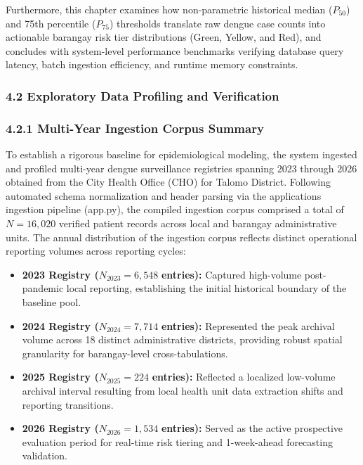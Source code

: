 \documentclass[
]{article}
\begin{document}
Furthermore, this chapter examines how non-parametric historical median
(\(P_{50}\)) and 75th percentile (\(P_{75}\)) thresholds translate raw
dengue case counts into actionable barangay risk tier distributions
(Green, Yellow, and Red), and concludes with system-level performance
benchmarks verifying database query latency, batch ingestion efficiency,
and runtime memory constraints.

\subsubsection{\texorpdfstring{\textbf{4.2 Exploratory Data Profiling
and Verification}
}{4.2 Exploratory Data Profiling and Verification }}\label{exploratory-data-profiling-and-verification}

\subsubsection{}\label{section-10}

\subsubsection{\texorpdfstring{\textbf{4.2.1 Multi-Year Ingestion Corpus
Summary}}{4.2.1 Multi-Year Ingestion Corpus Summary}}\label{multi-year-ingestion-corpus-summary}

To establish a rigorous baseline for epidemiological modeling, the
system ingested and profiled multi-year dengue surveillance registries
spanning 2023 through 2026 obtained from the City Health Office (CHO)
for Talomo District. Following automated schema normalization and header
parsing via the application\textquotesingle s ingestion pipeline
(app.py), the compiled ingestion corpus comprised a total of
\(N = 16,020\) verified patient records across local and barangay
administrative units. The annual distribution of the ingestion corpus
reflects distinct operational reporting volumes across reporting cycles:

\begin{itemize}
\item
  \textbf{2023 Registry (}\(N_{2023} = 6,548\) \textbf{entries):}
  Captured high-volume post-pandemic local reporting, establishing the
  initial historical boundary of the baseline pool.
\item
  \textbf{2024 Registry (}\(N_{2024} = 7,714\) \textbf{entries):}
  Represented the peak archival volume across 18 distinct administrative
  districts, providing robust spatial granularity for barangay-level
  cross-tabulations.
\item
  \textbf{2025 Registry (}\(N_{2025} = 224\) \textbf{entries):}
  Reflected a localized low-volume archival interval resulting from
  local health unit data extraction shifts and reporting transitions.
\item
  \textbf{2026 Registry (}\(N_{2026} = 1,534\) \textbf{entries):} Served
  as the active prospective evaluation period for real-time risk tiering
  and 1-week-ahead forecasting validation.
\end{itemize}
\end{document}
